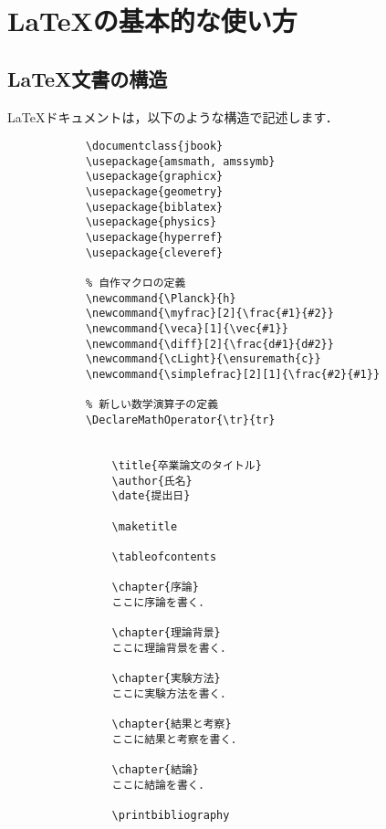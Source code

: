 \chapter{\LaTeX の基本的な使い方}

    \section{\LaTeX 文書の構造}
    \LaTeX ドキュメントは，以下のような構造で記述します．
        \begin{verbatim}
            \documentclass{jbook}
            \usepackage{amsmath, amssymb}
            \usepackage{graphicx}
            \usepackage{geometry}
            \usepackage{biblatex}
            \usepackage{physics}
            \usepackage{hyperref}
            \usepackage{cleveref}
            
            % 自作マクロの定義
            \newcommand{\Planck}{h}
            \newcommand{\myfrac}[2]{\frac{#1}{#2}}
            \newcommand{\veca}[1]{\vec{#1}}
            \newcommand{\diff}[2]{\frac{d#1}{d#2}}
            \newcommand{\cLight}{\ensuremath{c}}
            \newcommand{\simplefrac}[2][1]{\frac{#2}{#1}}

            % 新しい数学演算子の定義
            \DeclareMathOperator{\tr}{tr}

            
                \title{卒業論文のタイトル}
                \author{氏名}
                \date{提出日}

                \maketitle

                \tableofcontents

                \chapter{序論}
                ここに序論を書く．

                \chapter{理論背景}
                ここに理論背景を書く．

                \chapter{実験方法}
                ここに実験方法を書く．

                \chapter{結果と考察}
                ここに結果と考察を書く．

                \chapter{結論}
                ここに結論を書く．

                \printbibliography

            
        \end{verbatim}

